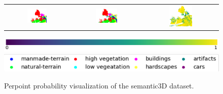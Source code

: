 \begin{figure}[h!]
\begin{tabular}{ccc}
            \includegraphics[width=0.33\textwidth, height=0.18\textheight]{images/seg_output/sem3d_seg_output/3_GT.pdf} &
            \includegraphics[width=0.33\textwidth, height=0.18\textheight]{images/seg_output/sem3d_seg_output/3_Pred.pdf}& 
            \includegraphics[width=0.33\textwidth, height=0.18\textheight]{images/seg_output/sem3d_seg_output/3_max_prob.pdf}\\
        \end{tabular}
        \includegraphics[scale=0.45]{images/prob_legend.pdf}
        \includegraphics[scale=0.65]{images/legend.png}
        \caption{Perpoint probability visualization of the semantic3D dataset.}
        \label{fig:de_sem3d_probmap}
    \end{figure}

